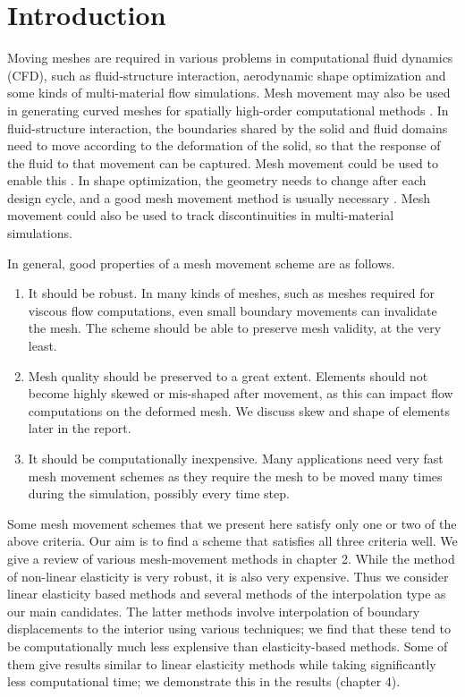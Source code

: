 \chapter{Introduction}

Moving meshes are required in various problems in computational fluid dynamics (CFD), such as fluid-structure interaction, aerodynamic shape optimization \cite{appl:opt, appl:mavriplis} and some kinds of multi-material flow simulations. Mesh movement may also be used in generating curved meshes for spatially high-order computational methods \cite{curve:persson}. In fluid-structure interaction, the boundaries shared by the solid and fluid domains need to move according to the deformation of the solid, so that the response of the fluid to that movement can be captured. Mesh movement could be used to enable this \cite{mm:fsielast}. In shape optimization, the geometry needs to change after each design cycle, and a good mesh movement method is usually necessary \cite{appl:opt}. Mesh movement could also be used to track discontinuities in multi-material simulations.

In general, good properties of a mesh movement scheme are as follows.
\begin{enumerate}
\item It should be robust. In many kinds of meshes, such as meshes required for viscous flow computations, even small boundary movements can invalidate the mesh. The scheme should be able to preserve mesh validity, at the very least.
\item Mesh quality should be preserved to a great extent. Elements should not become highly skewed or mis-shaped after movement, as this can impact flow computations on the deformed mesh. We discuss skew and shape of elements later in the report.
\item It should be computationally inexpensive. Many applications need very fast mesh movement schemes as they require the mesh to be moved many times during the simulation, possibly every time step.
\end{enumerate}
Some mesh movement schemes that we present here satisfy only one or two of the above criteria. Our aim is to find a scheme that satisfies all three criteria well. We give a review of various mesh-movement methods in chapter 2. While the method of non-linear elasticity \cite{curve:persson} is very robust, it is also very expensive. Thus we consider linear elasticity based methods and several methods of the interpolation type as our main candidates. The latter methods involve interpolation of boundary displacements to the interior using various techniques; we find that these tend to be computationally much less explensive than elasticity-based methods. Some of them give results similar to linear elasticity methods while taking significantly less computational time; we demonstrate this in the results (chapter 4).

